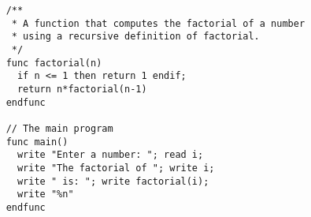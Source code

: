 \begin{verbatim}
    /**
     * A function that computes the factorial of a number
     * using a recursive definition of factorial.
     */
    func factorial(n)
      if n <= 1 then return 1 endif;
      return n*factorial(n-1)
    endfunc

    // The main program
    func main()
      write "Enter a number: "; read i;
      write "The factorial of "; write i;
      write " is: "; write factorial(i);
      write "%n"
    endfunc
\end{verbatim}
